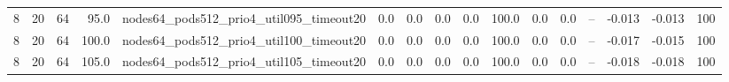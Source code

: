 \begin{tabular}{r r r r l c c c c c c c c c c r}
8 & 20 & 64 & 95.0 & nodes64\_pods512\_prio4\_util095\_timeout20 & 0.0 & 0.0 & 0.0 & 0.0 & 100.0 & 0.0 & 0.0 & -- & -0.013 & -0.013 & 100 \\
8 & 20 & 64 & 100.0 & nodes64\_pods512\_prio4\_util100\_timeout20 & 0.0 & 0.0 & 0.0 & 0.0 & 100.0 & 0.0 & 0.0 & -- & -0.017 & -0.015 & 100 \\
8 & 20 & 64 & 105.0 & nodes64\_pods512\_prio4\_util105\_timeout20 & 0.0 & 0.0 & 0.0 & 0.0 & 100.0 & 0.0 & 0.0 & -- & -0.018 & -0.018 & 100 \\
\bottomrule
\end{tabular}
